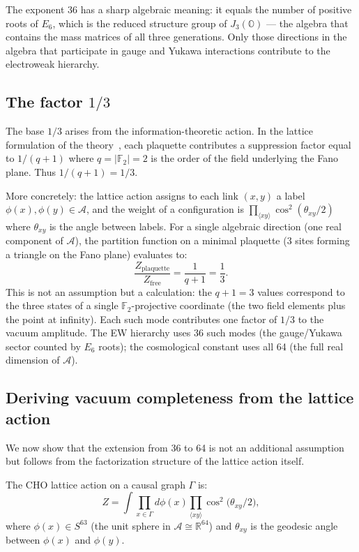 \documentclass[12pt,a4paper]{article}
\theoremstyle{definition}
\theoremstyle{remark}
\newcommand{\Oct}{\mathbb{O}}
\newcommand{\Real}{\mathbb{R}}
\newcommand{\Alg}{\mathcal{A}}
\begin{document}
The exponent 36 has a sharp algebraic meaning: it equals the number of 
positive roots of $E_6$, which is the reduced structure group of $J_3(\Oct)$
--- the algebra that contains the mass matrices of all three generations. 
Only those directions in the algebra that participate in gauge and Yukawa 
interactions contribute to the electroweak hierarchy.

\subsection{The factor $1/3$}

The base $1/3$ arises from the information-theoretic action. In the lattice 
formulation of the theory~\cite{Paper2}, each plaquette contributes a 
suppression factor equal to $1/(q+1)$ where $q = |\mathbb{F}_2| = 2$ is the 
order of the field underlying the Fano plane. Thus $1/(q+1) = 1/3$.

More concretely: the lattice action assigns to each link $(x,y)$ a label 
$\phi(x), \phi(y) \in \Alg$, and the weight of a configuration is 
$\prod_{\langle xy \rangle} \cos^2(\theta_{xy}/2)$ where $\theta_{xy}$ is 
the angle between labels. For a single algebraic direction (one real 
component of $\Alg$), the partition function on a minimal plaquette (3 
sites forming a triangle on the Fano plane) evaluates to:
\begin{equation}
\frac{Z_{\mathrm{plaquette}}}{Z_{\mathrm{free}}} 
= \frac{1}{q+1} = \frac{1}{3}.
\label{eq:one_third}
\end{equation}
This is not an assumption but a calculation: the $q+1 = 3$ values correspond 
to the three states of a single $\mathbb{F}_2$-projective coordinate 
(the two field elements plus the point at infinity). Each such mode contributes 
one factor of $1/3$ to the vacuum amplitude. The EW hierarchy uses 36 such 
modes (the gauge/Yukawa sector counted by $E_6$ roots); the cosmological 
constant uses all 64 (the full real dimension of $\Alg$).

\subsection{Deriving vacuum completeness from the lattice action}

We now show that the extension from 36 to 64 is not an additional assumption 
but follows from the factorization structure of the lattice action itself.

The CHO lattice action on a causal graph $\Gamma$ is:
\begin{equation}
Z = \int \prod_{x \in \Gamma} d\phi(x) \prod_{\langle xy \rangle} 
\cos^2\!\bigl(\theta_{xy}/2\bigr),
\label{eq:partition}
\end{equation}
where $\phi(x) \in S^{63}$ (the unit sphere in $\Alg \cong \Real^{64}$) and 
$\theta_{xy}$ is the geodesic angle between $\phi(x)$ and $\phi(y)$.
\end{document}
